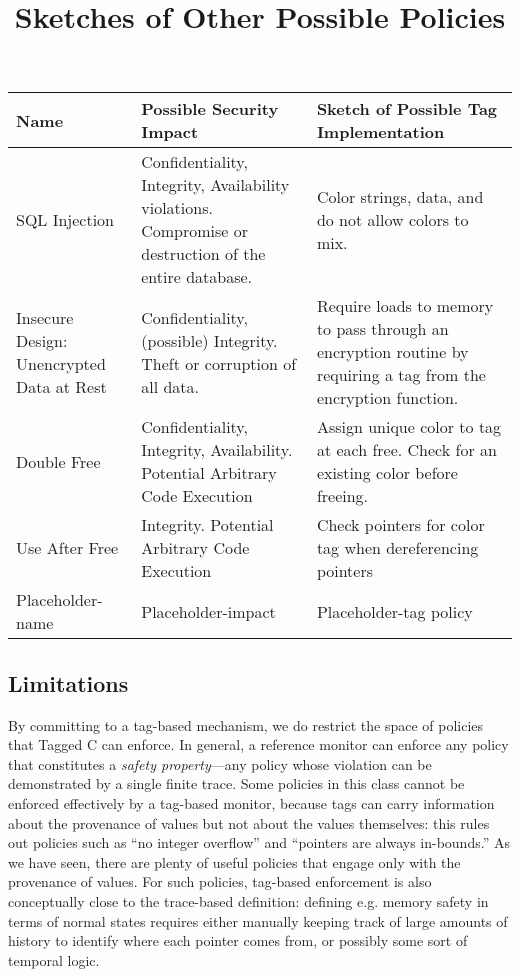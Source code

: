 \documentclass{llncs}
\begin{document}
\begin{table}
  \begin{center}
    \title{Sketches of Other Possible Policies}
    \begin{tabular}{  p{5cm} | p{5cm}| p{5cm}  } 
      \textbf{Name} & \textbf{Possible Security Impact} & \textbf{Sketch of Possible Tag Implementation} \\ 
      \hline
      SQL Injection & Confidentiality, Integrity, Availability violations. Compromise or destruction of the entire database. & Color strings, data, and do not allow colors to mix. \\  
      Insecure Design: Unencrypted Data at Rest & Confidentiality, (possible) Integrity. Theft or corruption of all data. & Require loads to memory to pass through an encryption routine by requiring a tag from the encryption function.  \\ 
      Double Free & Confidentiality, Integrity, Availability. Potential Arbitrary Code Execution & Assign unique color to tag at each free. Check for an existing color before freeing. \\
      Use After Free & Integrity. Potential Arbitrary Code Execution & Check pointers for color tag when dereferencing pointers  \\
      Placeholder-name & Placeholder-impact & Placeholder-tag policy \\
      \hline
    \end{tabular}
  \end{center}
\end{table}
  
\subsection{Limitations}
\label{sec:limitations}

By committing to a tag-based mechanism, we do restrict the space of policies that Tagged C
can enforce. In general, a reference monitor can enforce any policy that constitutes a
{\em safety property}---any policy whose violation can be demonstrated by a single finite
trace. Some policies in this class cannot be enforced effectively by a tag-based monitor,
because tags can carry information about the provenance of values but not about the values
themselves: this rules out policies such as ``no integer overflow'' and
``pointers are always in-bounds.'' As we have seen, there are plenty of useful policies that
engage only with the provenance of values. For such policies, tag-based enforcement is
also conceptually close to the trace-based definition: defining e.g. memory safety in terms
of normal states requires either manually keeping track of large amounts of history to
identify where each pointer comes from, or possibly some sort of temporal logic.
\end{document}
